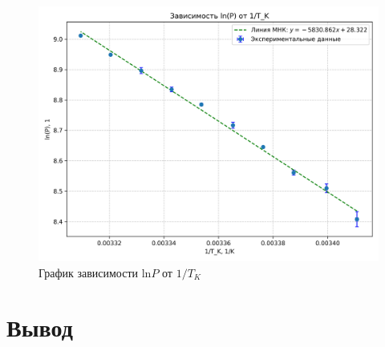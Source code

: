 \documentclass[a4paper,12pt]{article} %
\begin{document}
\begin{figure}
    \centering
    \includegraphics[scale = 0.75]{graph2.png}
    \caption{График зависимости $\mbox{ln}P$ от $1/T_K$}
    \label{fig:graph2}
\end{figure}



\section{Вывод}
\end{document}
